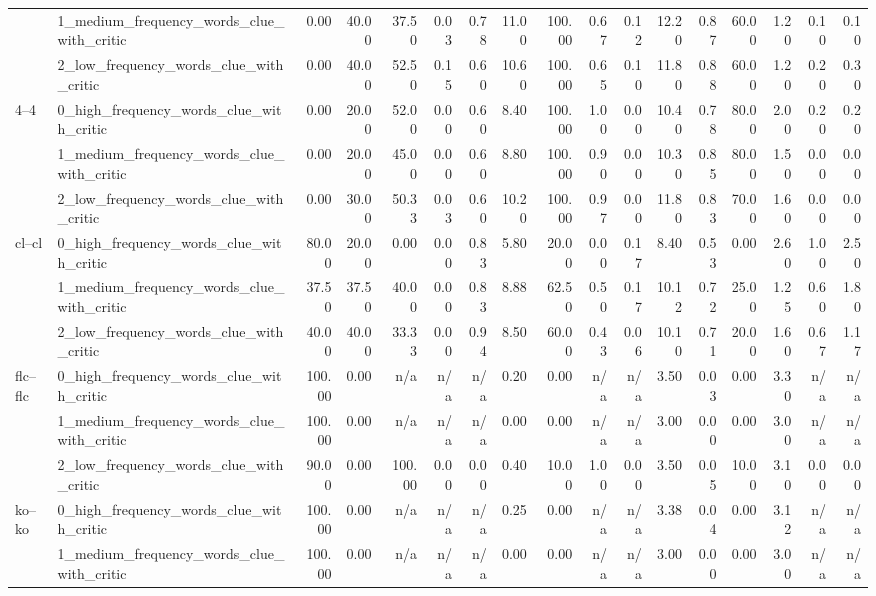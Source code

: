\begin{tabular}{llrrrrrrrrrrrrrrr}
 & 1_medium_frequency_words_clue_with_critic & 0.00 & 40.00 & 37.50 & 0.03 & 0.78 & 11.00 & 100.00 & 0.67 & 0.12 & 12.20 & 0.87 & 60.00 & 1.20 & 0.10 & 0.10 \\
 & 2_low_frequency_words_clue_with_critic & 0.00 & 40.00 & 52.50 & 0.15 & 0.60 & 10.60 & 100.00 & 0.65 & 0.10 & 11.80 & 0.88 & 60.00 & 1.20 & 0.20 & 0.30 \\
\cline{1-17}
\multirow[t]{3}{*}{4--4} & 0_high_frequency_words_clue_with_critic & 0.00 & 20.00 & 52.00 & 0.00 & 0.60 & 8.40 & 100.00 & 1.00 & 0.00 & 10.40 & 0.78 & 80.00 & 2.00 & 0.20 & 0.20 \\
 & 1_medium_frequency_words_clue_with_critic & 0.00 & 20.00 & 45.00 & 0.00 & 0.60 & 8.80 & 100.00 & 0.90 & 0.00 & 10.30 & 0.85 & 80.00 & 1.50 & 0.00 & 0.00 \\
 & 2_low_frequency_words_clue_with_critic & 0.00 & 30.00 & 50.33 & 0.03 & 0.60 & 10.20 & 100.00 & 0.97 & 0.00 & 11.80 & 0.83 & 70.00 & 1.60 & 0.00 & 0.00 \\
\cline{1-17}
\multirow[t]{3}{*}{cl--cl} & 0_high_frequency_words_clue_with_critic & 80.00 & 20.00 & 0.00 & 0.00 & 0.83 & 5.80 & 20.00 & 0.00 & 0.17 & 8.40 & 0.53 & 0.00 & 2.60 & 1.00 & 2.50 \\
 & 1_medium_frequency_words_clue_with_critic & 37.50 & 37.50 & 40.00 & 0.00 & 0.83 & 8.88 & 62.50 & 0.50 & 0.17 & 10.12 & 0.72 & 25.00 & 1.25 & 0.60 & 1.80 \\
 & 2_low_frequency_words_clue_with_critic & 40.00 & 40.00 & 33.33 & 0.00 & 0.94 & 8.50 & 60.00 & 0.43 & 0.06 & 10.10 & 0.71 & 20.00 & 1.60 & 0.67 & 1.17 \\
\cline{1-17}
\multirow[t]{3}{*}{flc--flc} & 0_high_frequency_words_clue_with_critic & 100.00 & 0.00 & n/a & n/a & n/a & 0.20 & 0.00 & n/a & n/a & 3.50 & 0.03 & 0.00 & 3.30 & n/a & n/a \\
 & 1_medium_frequency_words_clue_with_critic & 100.00 & 0.00 & n/a & n/a & n/a & 0.00 & 0.00 & n/a & n/a & 3.00 & 0.00 & 0.00 & 3.00 & n/a & n/a \\
 & 2_low_frequency_words_clue_with_critic & 90.00 & 0.00 & 100.00 & 0.00 & 0.00 & 0.40 & 10.00 & 1.00 & 0.00 & 3.50 & 0.05 & 10.00 & 3.10 & 0.00 & 0.00 \\
\cline{1-17}
\multirow[t]{3}{*}{ko--ko} & 0_high_frequency_words_clue_with_critic & 100.00 & 0.00 & n/a & n/a & n/a & 0.25 & 0.00 & n/a & n/a & 3.38 & 0.04 & 0.00 & 3.12 & n/a & n/a \\
 & 1_medium_frequency_words_clue_with_critic & 100.00 & 0.00 & n/a & n/a & n/a & 0.00 & 0.00 & n/a & n/a & 3.00 & 0.00 & 0.00 & 3.00 & n/a & n/a \\

\end{tabular}
